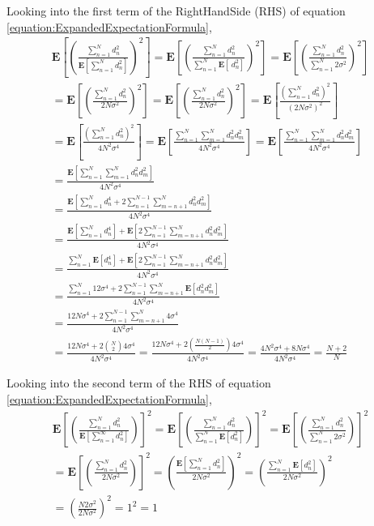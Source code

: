\documentclass[a4paper,12pt]{article}
\begin{document}
Looking into the first term of the RightHandSide (RHS) of equation \ref{equation:ExpandedExpectationFormula},
\begin{equation}
\label{equation:CurseOfDimLHS}
\begin{split}
\mathbf{E}[(\frac{\sum_{n=1}^{N} d_{n}^{2}}{\mathbf{E}[\sum_{n=1}^{N} d_{n}^{2}]})^{2}]
= 
\mathbf{E}[(\frac{\sum_{n=1}^{N} d_{n}^{2}}{\sum_{n=1}^{N} \mathbf{E}[\ d_{n}^{2}]})^{2}]
=
\mathbf{E}[(\frac{\sum_{n=1}^{N} d_{n}^{2}}{\sum_{n=1}^{N} 2\sigma^{2}})^{2}] \\
=
\mathbf{E}[(\frac{\sum_{n=1}^{N} d_{n}^{2}}{2N\sigma^{2}})^{2}]
= 
\mathbf{E}[(\frac{\sum_{n=1}^{N} d_{n}^{2}}{2N\sigma^{2}})^{2}]
=
\mathbf{E}[\frac{(\sum_{n=1}^{N} d_{n}^{2})^{2}}{(2N\sigma^{2})^{2}}] \\
= 
\mathbf{E}[\frac{(\sum_{n=1}^{N} d_{n}^{2})^{2}}{4N^{2}\sigma^{4}}]
=
\mathbf{E}[\frac{\sum_{n=1}^{N}\sum_{m=1}^{N}d_{n}^{2}d_{m}^{2}}{4N^{2}\sigma^{4}}]
=
\mathbf{E}[\frac{\sum_{n=1}^{N}\sum_{m=1}^{N}d_{n}^{2}d_{m}^{2}}{4N^{2}\sigma^{4}}] \\
=
\frac{\mathbf{E}[\sum_{n=1}^{N}\sum_{m=1}^{N}d_{n}^{2}d_{m}^{2}]}{4N^{2}\sigma^{4}} \\
= 
\frac{\mathbf{E}[\sum_{n=1}^{N}d_{n}^{4} + 2\sum_{n=1}^{N-1}\sum_{m=n+1}^{N}d_{n}^{2}d_{m}^{2}]}{4N^{2}\sigma^{4}} \\
=
\frac{\mathbf{E}[\sum_{n=1}^{N}d_{n}^{4}] + \mathbf{E}[2\sum_{n=1}^{N-1}\sum_{m=n+1}^{N}d_{n}^{2}d_{m}^{2}]}{4N^{2}\sigma^{4}} \\
=
\frac{\sum_{n=1}^{N}\mathbf{E}[d_{n}^{4}] + \mathbf{E}[2\sum_{n=1}^{N-1}\sum_{m=n+1}^{N}d_{n}^{2}d_{m}^{2}]}{4N^{2}\sigma^{4}} \\
= 
\frac{\sum_{n=1}^{N}12\sigma^{4} + 2\sum_{n=1}^{N-1}\sum_{m=n+1}^{N}\mathbf{E}[d_{n}^{2}d_{m}^{2}]}{4N^{2}\sigma^{4}} \\
=
\frac{12N\sigma^{4} + 2\sum_{n=1}^{N-1}\sum_{m=n+1}^{N} 4\sigma^{4}}{4N^{2}\sigma^{4}} \\
=
\frac{12N\sigma^{4} + 2{N \choose 2}4\sigma^{4}}{4N^{2}\sigma^{4}} 
=
\frac{12N\sigma^{4} + 2(\frac{N(N-1)}{2}) 4\sigma^{4}}{4N^{2}\sigma^{4}} 
= \frac{4N^{2}\sigma^{4} + 8N\sigma^{4}}{4N^{2}\sigma^{4}} = \frac{N + 2}{N}
\end{split}
\end{equation} 

Looking into the second term of the RHS of equation \ref{equation:ExpandedExpectationFormula},
\begin{equation}
\label{equation:CurseOfDimRHS}
\begin{split}
\mathbf{E}[(\frac{\sum_{n=1}^{N} d_{n}^{2}}{\mathbf{E}[\sum_{n=1}^{\infty} d_{n}^{2}]})]^{2} 
= 
\mathbf{E}[(\frac{\sum_{n=1}^{N} d_{n}^{2}}{\sum_{n=1}^{N} \mathbf{E}[d_{n}^{2}]})]^{2} 
=
\mathbf{E}[(\frac{\sum_{n=1}^{N} d_{n}^{2}}{\sum_{n=1}^{N} 2\sigma^{2}})]^{2} \\
= 
\mathbf{E}[(\frac{\sum_{n=1}^{N} d_{n}^{2}}{2N\sigma^{2}})]^{2} 
= 
(\frac{\mathbf{E}[\sum_{n=1}^{N} d_{n}^{2}]}{2N\sigma^{2}})^{2} 
=
(\frac{\sum_{n=1}^{N} \mathbf{E}[ d_{n}^{2}]}{2N\sigma^{2}})^{2} \\
=
(\frac{N2\sigma^{2}}{2N\sigma^{2}})^{2} = 1^{2} = 1
\end{split}
\end{equation} 
\end{document}
